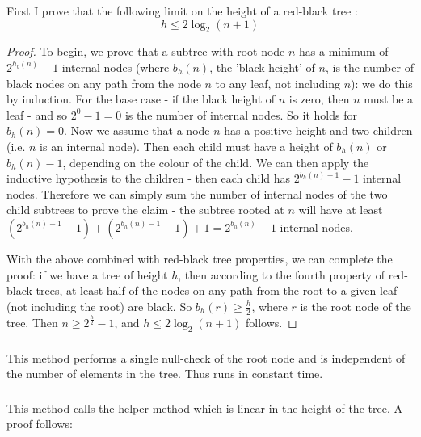 First I prove that the following limit on the height of a red-black tree \parencite{clrs}:
\begin{equation*}
h \leq 2\log_2(n+1)
\end{equation*}
\begin{proof}
To begin, we prove that a subtree with root node $n$ has a minimum of $2^{h_b(n)} - 1$ internal nodes (where $b_h(n)$, the 'black-height' of $n$, is the number of black nodes on any path from the node $n$ to any leaf, not including $n$): we do this by induction. For the base case - if the black height of $n$ is zero, then $n$ must be a leaf - and so $2^0 - 1 = 0$ is the number of internal nodes. So it holds for $b_h(n) = 0$. Now we assume that a node $n$ has a positive height and two children (i.e. $n$ is an internal node). Then each child must have a height of $b_h(n)$ or $b_h(n) - 1$, depending on the colour of the child. We can then apply the inductive hypothesis to the children - then each child has $2^{b_h(n) - 1} - 1$ internal nodes. Therefore we can simply sum the number of internal nodes of the two child subtrees to prove the claim - the subtree rooted at $n$ will have at least $(2^{b_h(n) - 1} - 1) + (2^{b_h(n) - 1} - 1) + 1 = 2^{b_h(n)} - 1$ internal nodes.

With the above combined with red-black tree properties, we can complete the proof: if we have a tree of height $h$, then according to the fourth property of red-black trees, at least half of the nodes on any path from the root to a given leaf (not including the root) are black. So $b_h(r) \geq \frac{h}{2}$, where $r$ is the root node of the tree. Then $n \geq 2^{\frac h 2} - 1$, and $h \leq 2\log_2(n + 1)$ follows.
\end{proof}

\subsubsection{}
This method performs a single null-check of the root node and is independent of the number of elements in the tree. Thus  runs in constant time.

\subsubsection{}
This method calls the helper method  which is linear in the height of the tree. A proof follows: \\


